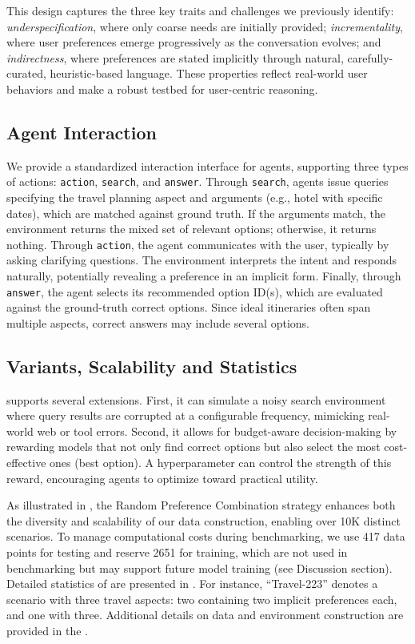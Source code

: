 This design captures the three key traits and challenges we previously identify: \textit{underspecification}, where only coarse needs are initially provided; \textit{incrementality}, where user preferences emerge progressively as the conversation evolves; and \textit{indirectness}, where preferences are stated implicitly through natural, carefully-curated, heuristic-based language. These properties reflect real-world user behaviors and make {\gymname} a robust testbed for user-centric reasoning.

\subsection{Agent Interaction}
We provide a standardized interaction interface for agents, supporting three types of actions: \texttt{action}, \texttt{search}, and \texttt{answer}. Through \texttt{search}, agents issue queries specifying the travel planning aspect and arguments (e.g., hotel with specific dates), which are matched against ground truth. If the arguments match, the environment returns the mixed set of relevant options; otherwise, it returns nothing. Through \texttt{action}, the agent communicates with the user, typically by asking clarifying questions. The environment interprets the intent and responds naturally, potentially revealing a preference in an implicit form. Finally, through \texttt{answer}, the agent selects its recommended option ID(s), which are evaluated against the ground-truth correct options. Since ideal itineraries often span multiple aspects, correct answers may include several options.



\subsection{Variants, Scalability and Statistics}
\label{sec:variants}
{\gymname} supports several extensions. First, it can simulate a noisy search environment where query results are corrupted at a configurable frequency, mimicking real-world web or tool errors. Second, it allows for budget-aware decision-making by rewarding models that not only find correct options but also select the most cost-effective ones (best option). A hyperparameter can control the strength of this reward, encouraging agents to optimize toward practical utility.

As illustrated in , the Random Preference Combination strategy enhances both the diversity and scalability of our data construction, enabling over 10K distinct scenarios. To manage computational costs during benchmarking, we use 417 data points for testing and reserve 2651 for training, which are not used in benchmarking but may support future model training (see Discussion section). Detailed statistics of {\gymname} are presented in . For instance, ``Travel-223'' denotes a scenario with three travel aspects: two containing two implicit preferences each, and one with three. Additional details on data and environment construction are provided in the .
